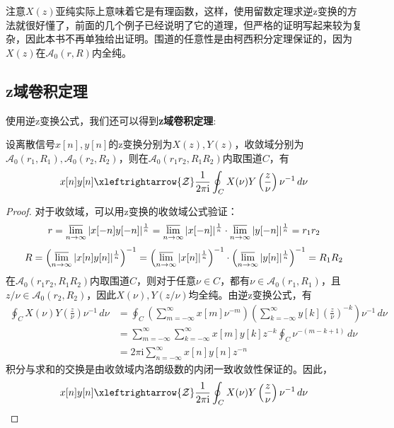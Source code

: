 \documentclass{ctexbook}
\begin{document}
注意$X(z)$亚纯实际上意味着它是有理函数，这样，使用留数定理求逆z变换的方法就很好懂了，前面的几个例子已经说明了它的道理，但严格的证明写起来较为复杂，因此本书不再单独给出证明。围道的任意性是由柯西积分定理保证的，因为$X(z)$在$\mathcal{A} _0(r,R)$内全纯。

\subsection{z域卷积定理}\label{sub:z_convolution}

使用逆z变换公式，我们还可以得到\textbf{z域卷积定理}:
\begin{theorem}[z域卷积定理]
    设离散信号$x[n],y[n]$的z变换分别为$X(z),Y(z)$，收敛域分别为$\mathcal{A} _0(r_1,R_1),\mathcal{A} _0(r_2,R_2)$，则在$\mathcal{A} _0(r_1 r_2,R_1 R_2)$内取围道$C$，有
    \[x[n]y[n]\xleftrightarrow{\mathcal{Z}} \frac{1}{2\pi \mathrm{i}}\oint_{C}X(\nu)Y\left(\frac{z}{\nu}\right)\nu^{-1}\,d\nu\]
\end{theorem}
\begin{proof}
    对于收敛域，可以用z变换的收敛域公式验证：
    \[r=\varlimsup_{n\to\infty}|x[-n]y[-n]|^{\frac{1}{n}}=\varlimsup_{n\to\infty}|x[-n]|^{\frac{1}{n}}\cdot\varlimsup_{n\to\infty}|y[-n]|^{\frac{1}{n}}=r_1 r_2\]
    \[R=\left(\varlimsup_{n\to\infty}|x[n]y[n]|^{\frac{1}{n}}\right)^{-1}=\left(\varlimsup_{n\to\infty}|x[n]|^{\frac{1}{n}}\right)^{-1}\cdot\left(\varlimsup_{n\to\infty}|y[n]|^{\frac{1}{n}}\right)^{-1}=R_1 R_2\]
    在$\mathcal{A} _0(r_1 r_2,R_1 R_2)$内取围道$C$，则对于任意$\nu\in C$，都有$\nu\in\mathcal{A} _0(r_1,R_1)$，且$z/\nu\in\mathcal{A} _0(r_2,R_2)$，因此$X(\nu),Y(z/\nu)$均全纯。由逆z变换公式，有
    \begin{align*}
        \oint_{C}X(\nu)Y\left(\frac{z}{\nu}\right)\nu^{-1}\,d\nu&=\oint_{C}\left(\sum_{m=-\infty}^{\infty}x[m]\nu^{-m}\right)\left(\sum_{k=-\infty}^{\infty}y[k]\left(\frac{z}{\nu}\right)^{-k}\right)\nu^{-1}\,d\nu\\
        &=\sum_{m=-\infty}^{\infty}\sum_{k=-\infty}^{\infty}x[m]y[k]z^{-k}\oint_{C}\nu^{-(m-k+1)}\,d\nu\\
        &=2\pi \mathrm{i} \sum_{n=-\infty}^{\infty}x[n]y[n]z^{-n}
    \end{align*}
    积分与求和的交换是由收敛域内洛朗级数的内闭一致收敛性保证的。因此，
    \[x[n]y[n]\xleftrightarrow{\mathcal{Z}} \frac{1}{2\pi \mathrm{i}}\oint_{C}X(\nu)Y\left(\frac{z}{\nu}\right)\nu^{-1}\,d\nu\]
\end{proof}
\end{document}
